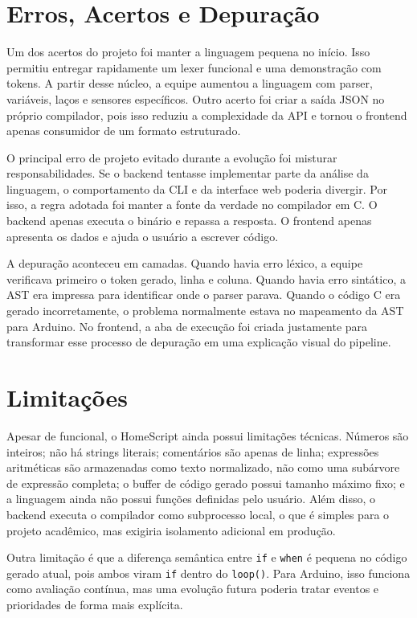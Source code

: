 \documentclass[conference]{IEEEtran}
\begin{document}
\section{Erros, Acertos e Depuração}
Um dos acertos do projeto foi manter a linguagem pequena no início. Isso permitiu entregar rapidamente um lexer funcional e uma demonstração com tokens. A partir desse núcleo, a equipe aumentou a linguagem com parser, variáveis, laços e sensores específicos. Outro acerto foi criar a saída JSON no próprio compilador, pois isso reduziu a complexidade da API e tornou o frontend apenas consumidor de um formato estruturado.

O principal erro de projeto evitado durante a evolução foi misturar responsabilidades. Se o backend tentasse implementar parte da análise da linguagem, o comportamento da CLI e da interface web poderia divergir. Por isso, a regra adotada foi manter a fonte da verdade no compilador em C. O backend apenas executa o binário e repassa a resposta. O frontend apenas apresenta os dados e ajuda o usuário a escrever código.

A depuração aconteceu em camadas. Quando havia erro léxico, a equipe verificava primeiro o token gerado, linha e coluna. Quando havia erro sintático, a AST era impressa para identificar onde o parser parava. Quando o código C era gerado incorretamente, o problema normalmente estava no mapeamento da AST para Arduino. No frontend, a aba de execução foi criada justamente para transformar esse processo de depuração em uma explicação visual do pipeline.

\section{Limitações}
Apesar de funcional, o HomeScript ainda possui limitações técnicas. Números são inteiros; não há strings literais; comentários são apenas de linha; expressões aritméticas são armazenadas como texto normalizado, não como uma subárvore de expressão completa; o buffer de código gerado possui tamanho máximo fixo; e a linguagem ainda não possui funções definidas pelo usuário. Além disso, o backend executa o compilador como subprocesso local, o que é simples para o projeto acadêmico, mas exigiria isolamento adicional em produção.

Outra limitação é que a diferença semântica entre \texttt{if} e \texttt{when} é pequena no código gerado atual, pois ambos viram \texttt{if} dentro do \texttt{loop()}. Para Arduino, isso funciona como avaliação contínua, mas uma evolução futura poderia tratar eventos e prioridades de forma mais explícita.
\end{document}
